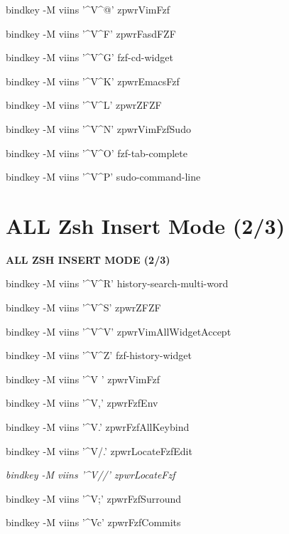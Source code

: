 \documentclass[11pt,a4paper,twoside]{book}
\begin{document}
bindkey -M viins '\textasciicircum{}V\textasciicircum{}@' zpwrVimFzf

bindkey -M viins '\textasciicircum{}V\textasciicircum{}F' zpwrFasdFZF

bindkey -M viins '\textasciicircum{}V\textasciicircum{}G' fzf-cd-widget

bindkey -M viins '\textasciicircum{}V\textasciicircum{}K' zpwrEmacsFzf

bindkey -M viins '\textasciicircum{}V\textasciicircum{}L' zpwrZFZF

bindkey -M viins '\textasciicircum{}V\textasciicircum{}N' zpwrVimFzfSudo

bindkey -M viins '\textasciicircum{}V\textasciicircum{}O' fzf-tab-complete

bindkey -M viins '\textasciicircum{}V\textasciicircum{}P' sudo-command-line


\vspace{16pt}

\section{ALL Zsh Insert Mode (2/3)}


\vspace{10pt}
{\large\bfseries\color{neoncyan} ALL ZSH INSERT MODE (2/3)}\vspace{6pt}

bindkey -M viins '\textasciicircum{}V\textasciicircum{}R' history-search-multi-word

bindkey -M viins '\textasciicircum{}V\textasciicircum{}S' zpwrZFZF

bindkey -M viins '\textasciicircum{}V\textasciicircum{}V' zpwrVimAllWidgetAccept

bindkey -M viins '\textasciicircum{}V\textasciicircum{}Z' fzf-history-widget

bindkey -M viins '\textasciicircum{}V ' zpwrVimFzf

bindkey -M viins '\textasciicircum{}V,' zpwrFzfEnv

bindkey -M viins '\textasciicircum{}V.' zpwrFzfAllKeybind

bindkey -M viins '\textasciicircum{}V/.' zpwrLocateFzfEdit

{\small\itshape\color{dimtext} bindkey -M viins '\textasciicircum{}V//' zpwrLocateFzf}

bindkey -M viins '\textasciicircum{}V;' zpwrFzfSurround

bindkey -M viins '\textasciicircum{}Vc' zpwrFzfCommits
\end{document}
